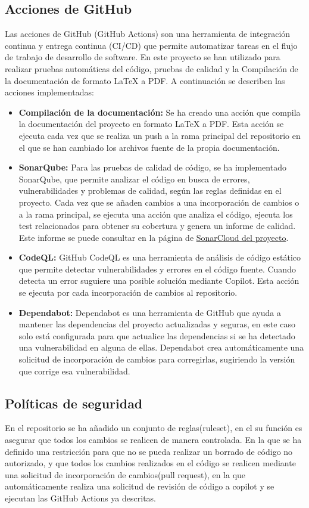 \subsection{Acciones de GitHub}
Las acciones de GitHub (GitHub Actions) son una herramienta de integración continua y entrega continua (CI/CD) que permite automatizar tareas en el flujo de trabajo de desarrollo de software. En este proyecto se han utilizado para realizar pruebas automáticas del código, pruebas de calidad y la Compilación de la documentación de formato LaTeX a PDF. A continuación se describen las acciones implementadas:
\begin{itemize}
    \item \textbf{Compilación de la documentación:} Se ha creado una acción que compila la documentación del proyecto en formato LaTeX a PDF. Esta acción se ejecuta cada vez que se realiza un push a la rama principal del repositorio en el que se han cambiado los archivos fuente de la propia documentación.
    \item \textbf{SonarQube:} Para las pruebas de calidad de código, se ha implementado SonarQube, que permite analizar el código en busca de errores, vulnerabilidades y problemas de calidad, según las reglas definidas en el proyecto. Cada vez que se añaden cambios a una incorporación de cambios o a la rama principal, se ejecuta una acción que analiza el código, ejecuta los test relacionados para obtener su cobertura y genera un informe de calidad. Este informe se puede consultar en la página de \href{https://sonarcloud.io/project/overview?id=CesarRodrigu_GII-24.19-contramedidas-IoT-mediante-reinforcement-learning}{SonarCloud del proyecto}.
    \item \textbf{CodeQL:} GitHub CodeQL es una herramienta de análisis de código estático que permite detectar vulnerabilidades y errores en el código fuente. Cuando detecta un error suguiere una posible solución mediante Copilot. Esta acción se ejecuta por cada incorporación de cambios al repositorio.
    \item \textbf{Dependabot:} Dependabot es una herramienta de GitHub que ayuda a mantener las dependencias del proyecto actualizadas y seguras, en este caso solo está configurada para que actualice las dependencias si se ha detectado una vulnerabilidad en alguna de ellas. Dependabot crea automáticamente una solicitud de incorporación de cambios para corregirlas, sugiriendo la versión que corrige esa vulnerabilidad.
\end{itemize}

\subsection{Políticas de seguridad}
En el repositorio se ha añadido un conjunto de reglas(ruleset), en el su función es asegurar que todos los cambios se realicen de manera controlada. En la que se ha definido una restricción para que no se pueda realizar un borrado de código no autorizado, y que todos los cambios realizados en el código se realicen mediante una solicitud de incorporación de cambios(pull request), en la que automáticamente realiza una solicitud de revisión de código a copilot y se ejecutan las GitHub Actions ya descritas.

